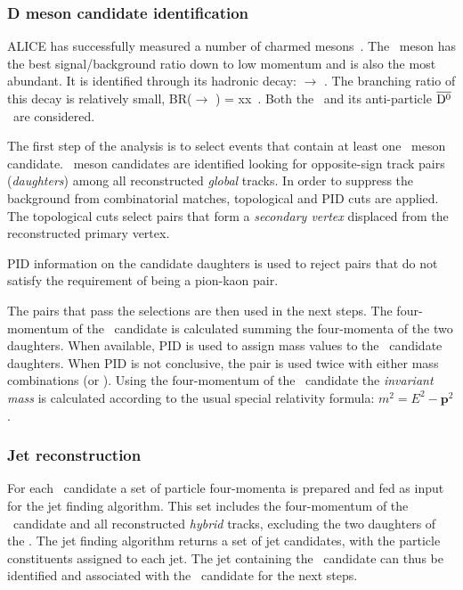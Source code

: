 \documentclass[12pt, a4paper, twoside, titlepage]{article}
\begin{document}
\subsubsection{D meson candidate identification}
ALICE has successfully measured a number of charmed mesons~\cite{}.
The \Dzero\ meson has the best signal/background ratio down to low momentum and
is also the most abundant.
It is identified through its hadronic decay: \Dzero $\rightarrow$ \pip \kam. The branching ratio of this decay
is relatively small, BR(\Dzero $\rightarrow$ \pip \kam) = xx~\cite{}. Both the \Dzero\ and its
anti-particle $\overline{\mathrm{D^{0}}}$~are considered.

The first step of the analysis is to select events that contain at least one \Dzero\ meson candidate.
\Dzero\ meson candidates are identified looking for opposite-sign track pairs (\emph{daughters}) among all reconstructed \emph{global} tracks.
In order to suppress the background from combinatorial matches, topological and PID cuts are applied.
The topological cuts select pairs that form a \emph{secondary vertex} displaced from the reconstructed
primary vertex. 

PID information on the \Dzero candidate daughters is used to reject pairs that do not satisfy the requirement of being a pion-kaon pair.

The pairs that pass the selections are then used in the next steps.
The four-momentum of the \Dzero\ candidate is calculated summing the four-momenta of the two daughters.
When available, PID is used to assign mass values to the \Dzero\ candidate daughters. When PID is not conclusive,
the pair is used twice with either mass combinations (\pip \kam or \pim \kap). Using the four-momentum of the \Dzero\ candidate
the \emph{invariant mass} is calculated according to the usual special relativity formula: $m^2 = E^2 - \bm{p}^2$.

\subsubsection{Jet reconstruction}
For each \Dzero\ candidate a set of particle four-momenta is prepared and fed as input for the jet finding algorithm.
This set includes the four-momentum of the \Dzero\ candidate and all reconstructed \emph{hybrid} tracks,
excluding the two daughters of the \Dzero. The jet finding algorithm returns a set of jet candidates, with the particle constituents
assigned to each jet. The jet containing the \Dzero\ candidate can thus be identified and associated with the \Dzero\ candidate for the next steps.
\end{document}
